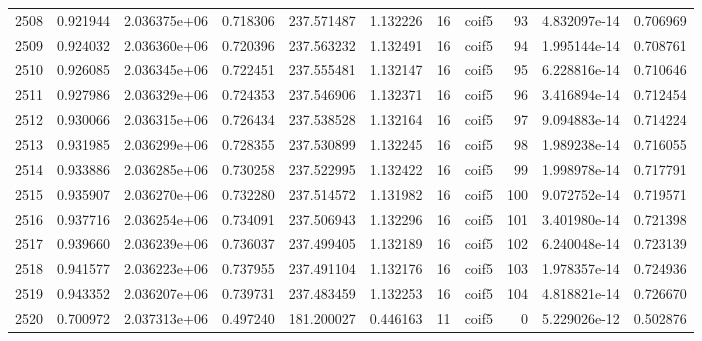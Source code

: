 \begin{tabular}{lrrrrrrlrrr}
2508 &    0.921944 &        2.036375e+06 &  0.718306 &              237.571487 &    1.132226 &      16 &        coif5 &     93 &   4.832097e-14 &      0.706969 \\
2509 &    0.924032 &        2.036360e+06 &  0.720396 &              237.563232 &    1.132491 &      16 &        coif5 &     94 &   1.995144e-14 &      0.708761 \\
2510 &    0.926085 &        2.036345e+06 &  0.722451 &              237.555481 &    1.132147 &      16 &        coif5 &     95 &   6.228816e-14 &      0.710646 \\
2511 &    0.927986 &        2.036329e+06 &  0.724353 &              237.546906 &    1.132371 &      16 &        coif5 &     96 &   3.416894e-14 &      0.712454 \\
2512 &    0.930066 &        2.036315e+06 &  0.726434 &              237.538528 &    1.132164 &      16 &        coif5 &     97 &   9.094883e-14 &      0.714224 \\
2513 &    0.931985 &        2.036299e+06 &  0.728355 &              237.530899 &    1.132245 &      16 &        coif5 &     98 &   1.989238e-14 &      0.716055 \\
2514 &    0.933886 &        2.036285e+06 &  0.730258 &              237.522995 &    1.132422 &      16 &        coif5 &     99 &   1.998978e-14 &      0.717791 \\
2515 &    0.935907 &        2.036270e+06 &  0.732280 &              237.514572 &    1.131982 &      16 &        coif5 &    100 &   9.072752e-14 &      0.719571 \\
2516 &    0.937716 &        2.036254e+06 &  0.734091 &              237.506943 &    1.132296 &      16 &        coif5 &    101 &   3.401980e-14 &      0.721398 \\
2517 &    0.939660 &        2.036239e+06 &  0.736037 &              237.499405 &    1.132189 &      16 &        coif5 &    102 &   6.240048e-14 &      0.723139 \\
2518 &    0.941577 &        2.036223e+06 &  0.737955 &              237.491104 &    1.132176 &      16 &        coif5 &    103 &   1.978357e-14 &      0.724936 \\
2519 &    0.943352 &        2.036207e+06 &  0.739731 &              237.483459 &    1.132253 &      16 &        coif5 &    104 &   4.818821e-14 &      0.726670 \\
2520 &    0.700972 &        2.037313e+06 &  0.497240 &              181.200027 &    0.446163 &      11 &        coif5 &      0 &   5.229026e-12 &      0.502876 \\

\end{tabular}
